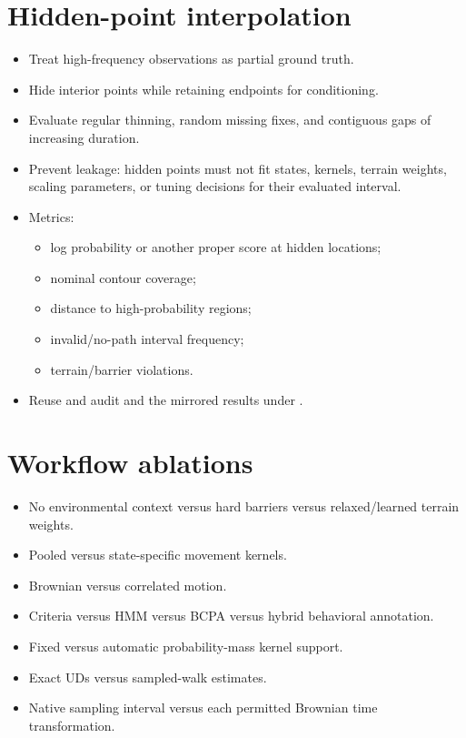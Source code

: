\section{Hidden-point interpolation}

\begin{itemize}
  \item Treat high-frequency observations as partial ground truth.
  \item Hide interior points while retaining endpoints for conditioning.
  \item Evaluate regular thinning, random missing fixes, and contiguous gaps of increasing duration.
  \item Prevent leakage: hidden points must not fit states, kernels, terrain weights, scaling parameters, or tuning decisions for their evaluated interval.
  \item Metrics:
  \begin{itemize}
    \item log probability or another proper score at hidden locations;
    \item nominal contour coverage;
    \item distance to high-probability regions;
    \item invalid/no-path interval frequency;
    \item terrain/barrier violations.
  \end{itemize}
  \item Reuse and audit  and the mirrored results under .
\end{itemize}

\section{Workflow ablations}

\begin{itemize}
  \item No environmental context versus hard barriers versus relaxed/learned terrain weights.
  \item Pooled versus state-specific movement kernels.
  \item Brownian versus correlated motion.
  \item Criteria versus HMM versus BCPA versus hybrid behavioral annotation.
  \item Fixed versus automatic probability-mass kernel support.
  \item Exact UDs versus sampled-walk estimates.
  \item Native sampling interval versus each permitted Brownian time transformation.
\end{itemize}

